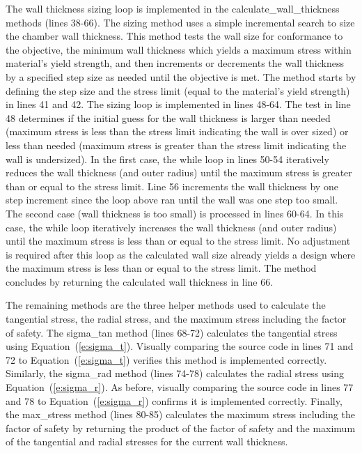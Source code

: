 \documentclass{article}
\begin{document}
The wall thickness sizing loop is implemented in the calculate\_wall\_thickness methods (lines 38-66).  The sizing method uses a simple incremental search to size the chamber wall thickness.  This method tests the wall size for conformance to the objective, the minimum wall thickness which yields a maximum stress within material's yield strength, and then increments or decrements the wall thickness by a specified step size as needed until the objective is met.  The method starts by defining the step size and the stress limit (equal to the material's yield strength) in lines 41 and 42.  The sizing loop is implemented in lines 48-64.  The test in line 48 determines if the initial guess for the wall thickness is larger than needed (maximum stress is less than the stress limit indicating the wall is over sized) or less than needed (maximum stress is greater than the stress limit indicating the wall is undersized).  In the first case, the while loop in lines 50-54 iteratively reduces the wall thickness (and outer radius) until the maximum stress is greater than or equal to the stress limit.  Line 56 increments the wall thickness by one step increment since the loop above ran until the wall was one step too small.  The second case (wall thickness is too small) is processed in lines 60-64.  In this case, the while loop iteratively increases the wall thickness (and outer radius) until the maximum stress is less than or equal to the stress limit.  No adjustment is required after this loop as the calculated wall size already yields a design where the maximum stress is less than or equal to the stress limit.  The method concludes by returning the calculated wall thickness in line 66.

The remaining methods are the three helper methods used to calculate the tangential stress, the radial stress, and the maximum stress including the factor of safety.  The sigma\_tan method (lines 68-72) calculates the tangential stress using Equation~(\ref{e:sigma_t}).  Visually comparing the source code in lines 71 and 72 to Equation~(\ref{e:sigma_t}) verifies this method is implemented correctly.  Similarly, the sigma\_rad method (lines 74-78) calculates the radial stress using Equation~(\ref{e:sigma_r}).  As before, visually comparing the source code in lines 77 and 78 to Equation~(\ref{e:sigma_r}) confirms it is implemented correctly.  Finally, the max\_stress method (lines 80-85) calculates the maximum stress including the factor of safety by returning the product of the factor of safety and the maximum of the tangential and radial stresses for the current wall thickness.
\end{document}
